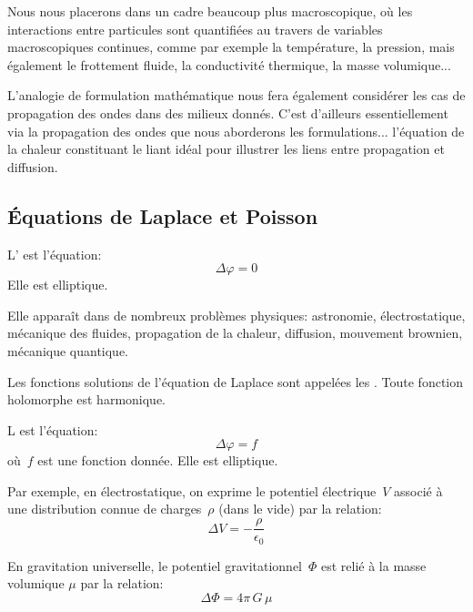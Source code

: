 \medskip
Nous nous placerons dans un cadre beaucoup plus macroscopique, où les interactions
entre particules sont quantifiées au travers de variables macroscopiques continues, comme
par exemple la température, la pression, mais également le frottement fluide, la
conductivité thermique, la masse volumique...

L'analogie de formulation mathématique nous fera également considérer les cas
de propagation des ondes dans des milieux donnés.
C'est d'ailleurs essentiellement via la propagation des ondes que nous aborderons
les formulations... l'équation de la chaleur constituant le liant idéal pour illustrer
les liens entre propagation et diffusion.

\medskip
\subsection{Équations de Laplace et Poisson}
L' est l'équation:
\begin{equation}\Delta \varphi=0\end{equation}
Elle est elliptique.

Elle apparaît dans de nombreux problèmes physiques: astronomie, électrostatique, 
mécanique des fluides, propagation de la chaleur, diffusion, mouvement brownien, mécanique quantique.

Les fonctions solutions de l'équation de Laplace sont appelées les .
Toute fonction holomorphe est harmonique.

\medskip
L est l'équation:
\begin{equation}\Delta \varphi=f\end{equation}
où~$f$ est une fonction donnée. Elle est elliptique.

\medskip
Par exemple, en électrostatique, on exprime le potentiel électrique~$V$ associé à une distribution 
connue de charges~$\rho$ (dans le vide) par la relation:
\begin{equation}
  \Delta V = - \dfrac{\rho}{\epsilon_0}
\end{equation}

En gravitation universelle, le potentiel gravitationnel~$\Phi$ est relié à la masse volumique 
$\mu$ par la relation:
\begin{equation}
\Delta \Phi = 4 \pi \, G \, \mu 
\end{equation}


